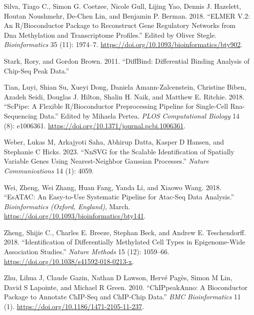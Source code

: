 \begin{cslreferences}
\leavevmode\hypertarget{ref-Silva2019}{}%
Silva, Tiago C., Simon G. Coetzee, Nicole Gull, Lijing Yao, Dennis J. Hazelett, Houtan Noushmehr, De-Chen Lin, and Benjamin P. Berman. 2018. ``ELMER V.2: An R/Bioconductor Package to Reconstruct Gene Regulatory Networks from Dna Methylation and Transcriptome Profiles.'' Edited by Oliver Stegle. \emph{Bioinformatics} 35 (11): 1974--7. \url{https://doi.org/10.1093/bioinformatics/bty902}.

\leavevmode\hypertarget{ref-Stark2011}{}%
Stark, Rory, and Gordon Brown. 2011. ``DiffBind: Differential Binding Analysis of Chip-Seq Peak Data.''

\leavevmode\hypertarget{ref-Tian2018}{}%
Tian, Luyi, Shian Su, Xueyi Dong, Daniela Amann-Zalcenstein, Christine Biben, Azadeh Seidi, Douglas J. Hilton, Shalin H. Naik, and Matthew E. Ritchie. 2018. ``ScPipe: A Flexible R/Bioconductor Preprocessing Pipeline for Single-Cell Rna-Sequencing Data.'' Edited by Mihaela Pertea. \emph{PLOS Computational Biology} 14 (8): e1006361. \url{https://doi.org/10.1371/journal.pcbi.1006361}.

\leavevmode\hypertarget{ref-webr23}{}%
Weber, Lukas M, Arkajyoti Saha, Abhirup Datta, Kasper D Hansen, and Stephanie C Hicks. 2023. ``NnSVG for the Scalable Identification of Spatially Variable Genes Using Nearest-Neighbor Gaussian Processes.'' \emph{Nature Communications} 14 (1): 4059.

\leavevmode\hypertarget{ref-Wei2018}{}%
Wei, Zheng, Wei Zhang, Huan Fang, Yanda Li, and Xiaowo Wang. 2018. ``EsATAC: An Easy-to-Use Systematic Pipeline for Atac-Seq Data Analysis.'' \emph{Bioinformatics (Oxford, England)}, March. \url{https://doi.org/10.1093/bioinformatics/bty141}.

\leavevmode\hypertarget{ref-Zheng2018a}{}%
Zheng, Shijie C., Charles E. Breeze, Stephan Beck, and Andrew E. Teschendorff. 2018. ``Identification of Differentially Methylated Cell Types in Epigenome-Wide Association Studies.'' \emph{Nature Methods} 15 (12): 1059--66. \url{https://doi.org/10.1038/s41592-018-0213-x}.

\leavevmode\hypertarget{ref-Zhu2010}{}%
Zhu, Lihua J, Claude Gazin, Nathan D Lawson, Hervé Pagès, Simon M Lin, David S Lapointe, and Michael R Green. 2010. ``ChIPpeakAnno: A Bioconductor Package to Annotate ChIP-Seq and ChIP-Chip Data.'' \emph{BMC Bioinformatics} 11 (1). \url{https://doi.org/10.1186/1471-2105-11-237}.
\end{cslreferences}



